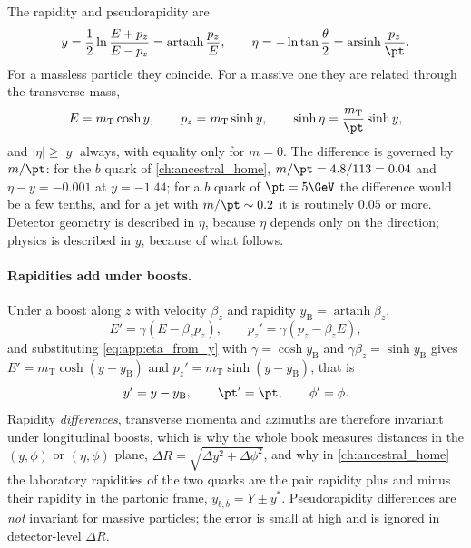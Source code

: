 The rapidity and pseudorapidity are
\begin{equation}
  y=\frac12\ln\frac{E+p_z}{E-p_z}=\operatorname{artanh}\frac{p_z}{E},\qquad
  \eta=-\ln\tan\frac\theta2=\operatorname{arsinh}\frac{p_z}{\pt}.
  \label{eq:app:y_eta}
\end{equation}
For a massless particle they coincide. For a massive one they are related
through the transverse mass,
\begin{equation}
  E=m_{\mathrm T}\cosh y,\qquad p_z=m_{\mathrm T}\sinh y,\qquad
  \sinh\eta=\frac{m_{\mathrm T}}{\pt}\sinh y,
  \label{eq:app:eta_from_y}
\end{equation}
and $|\eta|\ge|y|$ always, with equality only for $m=0$. The difference is
governed by $m/\pt$: for the $b$ quark of \cref{ch:ancestral_home},
$m/\pt=4.8/113=0.04$ and $\eta-y=-0.001$ at $y=-1.44$; for a $b$ quark of
$\pt=5\GeV$ the difference would be a few tenths, and for a jet with
$m/\pt\sim0.2$ it is routinely $0.05$ or more. Detector geometry is described
in $\eta$, because $\eta$ depends only on the direction; physics is described
in $y$, because of what follows.

\paragraph{Rapidities add under boosts.} Under a boost along $z$ with
velocity $\beta_z$ and rapidity $y_{\mathrm B}=\operatorname{artanh}\beta_z$,
\begin{equation}
  E'=\gamma(E-\beta_zp_z),\qquad p_z'=\gamma(p_z-\beta_zE),
\end{equation}
and substituting \cref{eq:app:eta_from_y} with $\gamma=\cosh y_{\mathrm B}$
and $\gamma\beta_z=\sinh y_{\mathrm B}$ gives $E'=m_{\mathrm T}\cosh(y-y_{\mathrm B})$
and $p_z'=m_{\mathrm T}\sinh(y-y_{\mathrm B})$, that is
\begin{equation}
  y'=y-y_{\mathrm B},\qquad \pt'=\pt,\qquad \phi'=\phi .
  \label{eq:app:boost}
\end{equation}
Rapidity \emph{differences}, transverse momenta and azimuths are therefore
invariant under longitudinal boosts, which is why the whole book measures
distances in the $(y,\phi)$ or $(\eta,\phi)$ plane,
$\Delta R=\sqrt{\Delta y^2+\Delta\phi^2}$, and why in
\cref{ch:ancestral_home} the laboratory rapidities of the two quarks are the
pair rapidity plus and minus their rapidity in the partonic frame,
$y_{b,\bar b}=Y\pm y^{*}$. Pseudorapidity differences are \emph{not}
invariant for massive particles; the error is small at high \pt and is
ignored in detector-level $\Delta R$.

